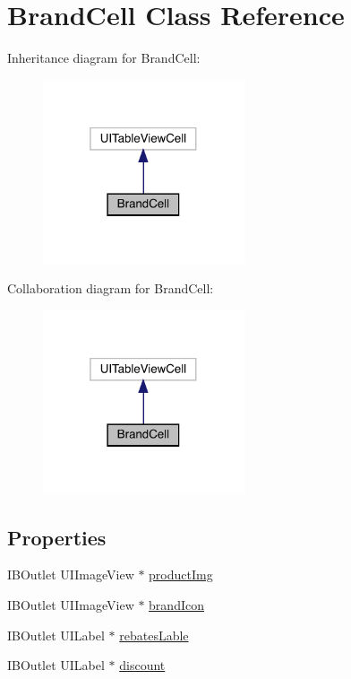 \hypertarget{interface_brand_cell}{}\section{Brand\+Cell Class Reference}
\label{interface_brand_cell}


Inheritance diagram for Brand\+Cell\+:\nopagebreak
\begin{figure}[H]
\begin{center}
\leavevmode
\includegraphics[width=169pt]{interface_brand_cell__inherit__graph}
\end{center}
\end{figure}


Collaboration diagram for Brand\+Cell\+:\nopagebreak
\begin{figure}[H]
\begin{center}
\leavevmode
\includegraphics[width=169pt]{interface_brand_cell__coll__graph}
\end{center}
\end{figure}
\subsection*{Properties}
\begin{DoxyCompactItemize}
\item 
I\+B\+Outlet U\+I\+Image\+View $\ast$ \mbox{\hyperlink{interface_brand_cell_ac60a39ad43edaea07fbb0a9cf97c3b2b}{product\+Img}}
\item 
I\+B\+Outlet U\+I\+Image\+View $\ast$ \mbox{\hyperlink{interface_brand_cell_a26a336fdc03ad714437ffcbee4595b80}{brand\+Icon}}
\item 
I\+B\+Outlet U\+I\+Label $\ast$ \mbox{\hyperlink{interface_brand_cell_aaa187041282ec12a782326e02879a7e0}{rebates\+Lable}}
\item 
I\+B\+Outlet U\+I\+Label $\ast$ \mbox{\hyperlink{interface_brand_cell_af2e704c17a841a15b9097014f6aab16c}{discount}}
\end{DoxyCompactItemize}


